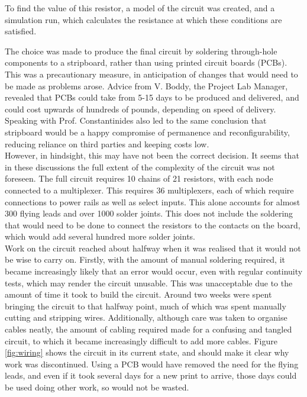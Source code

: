 To find the value of this resistor, a model of the circuit was created, and a simulation run, which calculates the resistance at which these conditions are satisfied. \\


The choice was made to produce the final circuit by soldering through-hole components to a stripboard, rather than using printed circuit boards (PCBs). This was a precautionary measure, in anticipation of changes that would need to be made as problems arose. Advice from V. Boddy, the Project Lab Manager, revealed that PCBs could take from 5-15 days to be produced and delivered, and could cost upwards of hundreds of pounds, depending on speed of delivery. Speaking with Prof. Constantinides also led to the same conclusion that stripboard would be a happy compromise of permanence and reconfigurability, reducing reliance on third parties and keeping costs low.\\

However, in hindsight, this may have not been the correct decision. It seems that in these discussions the full extent of the complexity of the circuit was not foreseen. The full circuit requires 10 chains of 21 resistors, with each node connected to a multiplexer. This requires 36 multiplexers, each of which require connections to power rails as well as select inputs. This alone accounts for almost 300 flying leads and over 1000 solder joints. This does not include the soldering that would need to be done to connect the resistors to the contacts on the board, which would add several hundred more solder joints. \\

Work on the circuit reached about halfway when it was realised that it would not be wise to carry on. Firstly, with the amount of manual soldering required, it became increasingly likely that an error would occur, even with regular continuity tests, which may render the circuit unusable. This was unacceptable due to the amount of time it took to build the circuit. Around two weeks were spent bringing the circuit to that halfway point, much of which was spent manually cutting and stripping wires. Additionally, although care was taken to organise cables neatly, the amount of cabling required made for a confusing and tangled circuit, to which it became increasingly difficult to add more cables. Figure \ref{fig:wiring} shows the circuit in its current state, and should make it clear why work was discontinued. Using a PCB would have removed the need for the flying leads, and even if it took several days for a new print to arrive, those days could be used doing other work, so would not be wasted.\\

